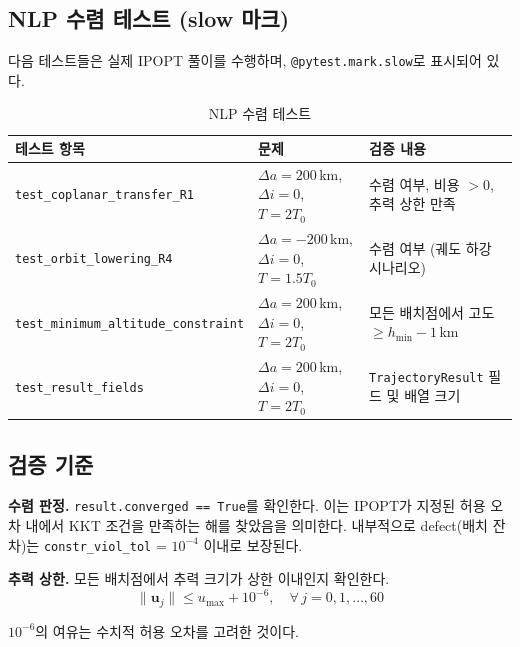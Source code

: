\documentclass[11pt]{article}
\begin{document}
\subsection{NLP 수렴 테스트 (slow 마크)}
\label{sec:convergence-test}

다음 테스트들은 실제 IPOPT 풀이를 수행하며, \texttt{@pytest.mark.slow}로 표시되어 있다.

\begin{table}[htbp]
\centering
\caption{NLP 수렴 테스트}
\label{tab:convergence-test}
\begin{tabular}{@{}lll@{}}
\toprule
테스트 항목 & 문제 & 검증 내용 \\
\midrule
\texttt{test\_coplanar\_transfer\_R1} & $\Delta a = 200$\,km, $\Delta i = 0$, $T = 2T_0$ & 수렴 여부, 비용 $> 0$, 추력 상한 만족 \\
\texttt{test\_orbit\_lowering\_R4} & $\Delta a = -200$\,km, $\Delta i = 0$, $T = 1.5T_0$ & 수렴 여부 (궤도 하강 시나리오) \\
\texttt{test\_minimum\_altitude\_constraint} & $\Delta a = 200$\,km, $\Delta i = 0$, $T = 2T_0$ & 모든 배치점에서 고도 $\geq h_{\min} - 1$\,km \\
\texttt{test\_result\_fields} & $\Delta a = 200$\,km, $\Delta i = 0$, $T = 2T_0$ & \texttt{TrajectoryResult} 필드 및 배열 크기 \\
\bottomrule
\end{tabular}
\end{table}


\subsection{검증 기준}
\label{sec:criteria}

\textbf{수렴 판정.} \texttt{result.converged == True}를 확인한다. 이는 IPOPT가 지정된 허용 오차 내에서 KKT 조건을 만족하는 해를 찾았음을 의미한다. 내부적으로 defect(배치 잔차)는 \texttt{constr\_viol\_tol} = $10^{-4}$ 이내로 보장된다.

\textbf{추력 상한.} 모든 배치점에서 추력 크기가 상한 이내인지 확인한다.
\[
\|\mathbf{u}_j\| \leq u_{\max} + 10^{-6}, \quad \forall\, j = 0, 1, \ldots, 60
\]

$10^{-6}$의 여유는 수치적 허용 오차를 고려한 것이다.
\end{document}
